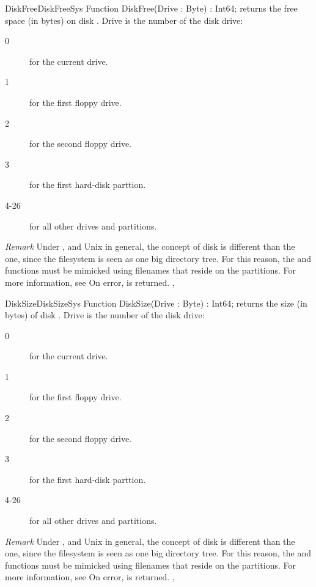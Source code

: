 \begin{functionl}{DiskFree}{DiskFreeSys}
\Declaration
Function DiskFree(Drive : Byte) : Int64;
\Description
{} returns the free space (in bytes) on disk .
Drive is the number of the disk drive:
\begin{description}
\item[0] for the current drive.
\item[1] for the first floppy drive.
\item[2] for the second floppy drive.
\item[3] for the first hard-disk parttion.
\item[4-26] for all other drives and partitions.
\end{description}

{\em Remark} Under \linux, and Unix in general, the concept of disk is
different than the \dos one, since the filesystem is seen as one big
directory tree. For this reason, the  and 
functions must be mimicked using filenames that reside on the partitions.
For more information, see 
\Errors
On error,  is returned.
\SeeAlso
{}, 
\end{functionl}



\begin{functionl}{DiskSize}{DiskSizeSys}
\Declaration
Function DiskSize(Drive : Byte) : Int64;
\Description
{} returns the size (in bytes) of disk .
Drive is the number of the disk drive:
\begin{description}
\item[0] for the current drive.
\item[1] for the first floppy drive.
\item[2] for the second floppy drive.
\item[3] for the first hard-disk parttion.
\item[4-26] for all other drives and partitions.
\end{description}

{\em Remark} Under \linux, and Unix in general, the concept of disk is
different than the \dos one, since the filesystem is seen as one big
directory tree. For this reason, the  and 
functions must be mimicked using filenames that reside on the partitions.
For more information, see 
\Errors
On error,  is returned.
\SeeAlso
{}, 
\end{functionl}


